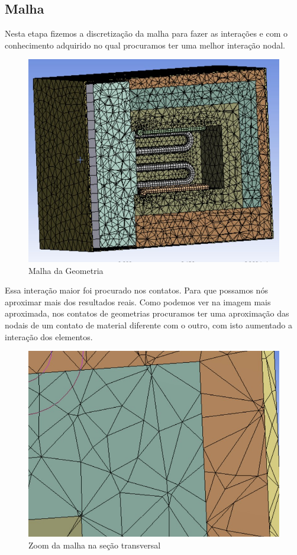 \subsection{Malha}
Nesta etapa fizemos a discretização da malha para fazer as interações e com o
conhecimento adquirido no qual procuramos ter uma melhor interação nodal.
\begin{figure}[H]
	\centering
	\label{ansys_malha1}
	\includegraphics[keepaspectratio=true,scale=0.55]{figuras/ansys_malha1.jpg}
	\caption{Malha da Geometria}
\end{figure}

Essa interação maior foi procurado nos contatos. Para que possamos nós aproximar mais dos
resultados reais. Como podemos ver na imagem mais aproximada, nos contatos de geometrias
procuramos ter uma aproximação das nodais de um contato de material diferente com o outro, com
isto aumentado a interação dos elementos.
\begin{figure}[H]
	\centering
	\label{ansys_malha2}
	\includegraphics[keepaspectratio=true,scale=0.8]{figuras/ansys_malha2.jpg}
	\caption{Zoom da malha na seção transversal}
\end{figure}

